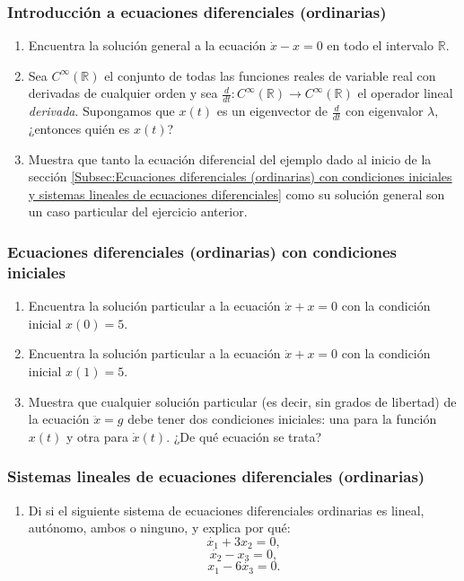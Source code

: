 \documentclass[12pt,libertine]{book}
\begin{document}
\subsubsection*{Introducción a ecuaciones diferenciales (ordinarias)}
\begin{enumerate}
    \item Encuentra la solución general a la ecuación $\dot{x}-x=0$ en todo el intervalo $\mathbb{R}$.
    \item Sea $C^{\infty}(\mathbb{R})$ el conjunto de todas las funciones reales de variable real con derivadas de cualquier orden y sea $\frac{d}{dt}:C^{\infty}(\mathbb{R})\to C^{\infty}(\mathbb{R})$ el operador lineal \emph{derivada}. Supongamos que $x(t)$ es un eigenvector de $\frac{d}{dt}$ con eigenvalor $\lambda,$ ¿entonces quién es $x(t)$?
    \item Muestra que tanto la ecuación diferencial del ejemplo dado al inicio de la sección \ref{Subsec:Ecuaciones diferenciales (ordinarias) con condiciones iniciales y sistemas lineales de ecuaciones diferenciales} como su solución general son un caso particular del ejercicio anterior.
\end{enumerate}

\subsubsection*{Ecuaciones diferenciales (ordinarias) con condiciones iniciales}
\begin{enumerate}
    \item Encuentra la solución particular a la ecuación $\dot{x}+x=0$ con la condición inicial $x(0)=5$.
    \item Encuentra la solución particular a la ecuación $\dot{x}+x=0$ con la condición inicial $x(1)=5$.
    \item Muestra que cualquier solución particular (es decir, sin grados de libertad) de la ecuación $\ddot{x}=g$ debe tener dos condiciones iniciales: una para la función $x(t)$ y otra para $\dot{x}(t)$. ¿De qué ecuación se trata?
\end{enumerate}

\subsubsection*{Sistemas lineales de ecuaciones diferenciales (ordinarias)}
\begin{enumerate}
    \item Di si el siguiente sistema de ecuaciones diferenciales ordinarias es lineal, autónomo, ambos o ninguno, y explica por qué: $$\dot{x_1}+3x_2 = 0,$$ $$\dot{x_2} - x_3 = 0,$$ $$x_1-6\dot{x_3} = 0.$$
\end{enumerate}
\end{document}
